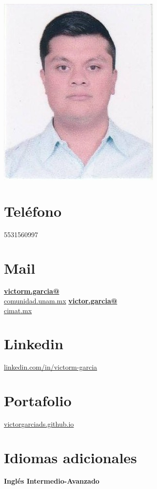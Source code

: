 \documentclass[]{friggeri-cv}
\begin{document}
\begin{aside}
  \includegraphics[scale=0.268]{img/foto2.png}
  \section{Teléfono}
    5531560997
  \section{Mail}
    \href{mailto:victorm.garcia@comunidad.unam.mx}{\textbf{victorm.garcia@}\\comunidad.unam.mx}
    \href{mailto:victor.garcia@cimat.mx}{\textbf{victor.garcia@}\\cimat.mx}
    \section{Linkedin}
    \url{linkedin.com/in/victorm-garcia}%
    \section{Portafolio}
    \url{victorgarciads.github.io}%
     \section{Idiomas adicionales}
    \textbf{Inglés Intermedio-Avanzado}

\end{aside}
\end{document}
